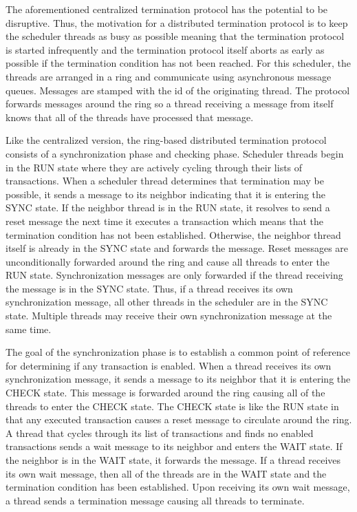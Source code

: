 The aforementioned centralized termination protocol has the potential to be disruptive.
Thus, the motivation for a distributed termination protocol is to keep the scheduler threads as busy as possible meaning that the termination protocol is started infrequently and the termination protocol itself aborts as early as possible if the termination condition has not been reached.
For this scheduler, the threads are arranged in a ring and communicate using asynchronous message queues.
Messages are stamped with the id of the originating thread.
The protocol forwards messages around the ring so a thread receiving a message from itself knows that all of the threads have processed that message.

Like the centralized version, the ring-based distributed termination protocol consists of a synchronization phase and checking phase.
Scheduler threads begin in the RUN state where they are actively cycling through their lists of transactions.
When a scheduler thread determines that termination may be possible, it sends a message to its neighbor indicating that it is entering the SYNC state.
If the neighbor thread is in the RUN state, it resolves to send a reset message the next time it executes a transaction which means that the termination condition has not been established.
Otherwise, the neighbor thread itself is already in the SYNC state and forwards the message.
Reset messages are unconditionally forwarded around the ring and cause all threads to enter the RUN state.
Synchronization messages are only forwarded if the thread receiving the message is in the SYNC state.
Thus, if a thread receives its own synchronization message, all other threads in the scheduler are in the SYNC state.
Multiple threads may receive their own synchronization message at the same time.

The goal of the synchronization phase is to establish a common point of reference for determining if any transaction is enabled.
When a thread receives its own synchronization message, it sends a message to its neighbor that it is entering the CHECK state.
This message is forwarded around the ring causing all of the threads to enter the CHECK state.
The CHECK state is like the RUN state in that any executed transaction causes a reset message to circulate around the ring.
A thread that cycles through its list of transactions and finds no enabled transactions sends a wait message to its neighbor and enters the WAIT state.
If the neighbor is in the WAIT state, it forwards the message.
If a thread receives its own wait message, then all of the threads are in the WAIT state and the termination condition has been established.
Upon receiving its own wait message, a thread sends a termination message causing all threads to terminate.

